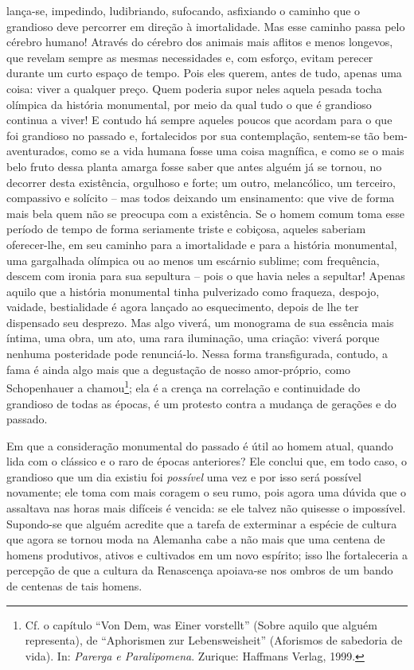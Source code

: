 lança-se, impedindo, ludibriando, sufocando, asfixiando o caminho que o
grandioso deve percorrer em direção à imortalidade. Mas esse caminho
passa pelo cérebro humano! Através do cérebro dos animais mais aflitos e
menos longevos, que revelam sempre as mesmas necessidades e, com
esforço, evitam perecer durante um curto espaço de tempo. Pois eles
querem, antes de tudo, apenas uma coisa: viver a qualquer preço. Quem
poderia supor neles aquela pesada tocha olímpica da história monumental,
por meio da qual tudo o que é grandioso continua a viver! E contudo há
sempre aqueles poucos que acordam para o que foi grandioso no passado e,
fortalecidos por sua contemplação, sentem-se tão bem-aventurados, como
se a vida humana fosse uma coisa magnífica, e como se o mais belo fruto
dessa planta amarga fosse saber que antes alguém já se tornou, no
decorrer desta existência, orgulhoso e forte; um outro, melancólico, um
terceiro, compassivo e solícito -- mas todos deixando um ensinamento:
que vive de forma mais bela quem não se preocupa com a existência. Se o
homem comum toma esse período de tempo de forma seriamente triste e
cobiçosa, aqueles saberiam oferecer-lhe, em seu caminho para a
imortalidade e para a história monumental, uma gargalhada olímpica ou ao
menos um escárnio sublime; com frequência, descem com ironia para sua
sepultura -- pois o que havia neles a sepultar! Apenas aquilo que a
história monumental tinha pulverizado como fraqueza, despojo, vaidade,
bestialidade é agora lançado ao esquecimento, depois de lhe ter
dispensado seu desprezo. Mas algo viverá, um monograma de sua essência
mais íntima, uma obra, um ato, uma rara iluminação, uma criação: viverá
porque nenhuma posteridade pode renunciá-lo. Nessa forma transfigurada,
contudo, a fama é ainda algo mais que a degustação de nosso
amor-próprio, como Schopenhauer a chamou\footnote{Cf. o capítulo ``Von
  Dem, was Einer vorstellt'' (Sobre aquilo que alguém representa), de
  ``Aphorismen zur Lebensweisheit'' (Aforismos de sabedoria de vida).
  In: \emph{Parerga e Paralipomena}. Zurique: Haffmans Verlag, 1999.}; ela é a crença na correlação e
continuidade do grandioso de todas as épocas, é um protesto contra a
mudança de gerações e do passado.

Em que a consideração monumental do passado é útil ao homem atual,
quando lida com o clássico e o raro de épocas anteriores? Ele conclui
que, em todo caso, o grandioso que um dia existiu foi \emph{possível}
uma vez e por isso será possível novamente; ele toma com mais coragem o
seu rumo, pois agora uma dúvida que o assaltava nas horas mais difíceis
é vencida: se ele talvez não quisesse o impossível. Supondo-se que
alguém acredite que a tarefa de exterminar a espécie de cultura que
agora se tornou moda na Alemanha cabe a não mais que uma centena de
homens produtivos, ativos e cultivados em um novo espírito; isso lhe
fortaleceria a percepção de que a cultura da Renascença apoiava-se nos
ombros de um bando de centenas de tais homens.


